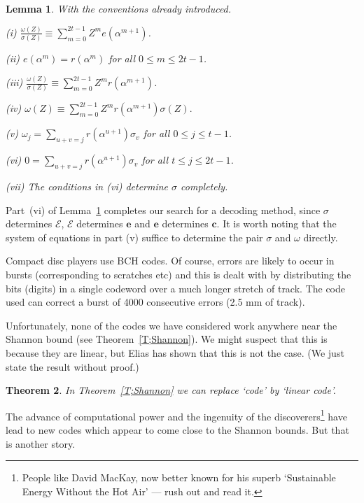 \documentclass[12pt,a4paper]{article}
\theoremstyle{plain}
\newtheorem{theorem}{Theorem}[section]
\newtheorem{lemma}[theorem]{Lemma}
\theoremstyle{definition}
\begin{document}
    \begin{lemma}
        \label{BCH decode}
        With the conventions already introduced.

        (i) ${\displaystyle
        \frac{\omega(Z)}{\sigma(Z)}\equiv
        \sum_{m=0}^{2t-1}Z^{m}e(\alpha^{m+1})}$.

        (ii) $e(\alpha^{m})=r(\alpha^{m})$ for all $0\leq m\leq 2t-1$.

        (iii) ${\displaystyle
        \frac{\omega(Z)}{\sigma(Z)}\equiv
        \sum_{m=0}^{2t-1}Z^{m}r(\alpha^{m+1})}$.

        (iv) $\omega(Z)\equiv\sum_{m=0}^{2t-1}Z^{m}r(\alpha^{m+1})
        \sigma(Z).$

        (v) ${\displaystyle
        \omega_{j}=\sum_{u+v=j}r(\alpha^{u+1})\sigma_{v}}$ for all
        $0\leq j\leq t-1$.

        (vi) ${\displaystyle
        0=\sum_{u+v=j}r(\alpha^{u+1})\sigma_{v}}$ for all $t\leq j\leq 2t-1$.

        (vii) The conditions in (vi) determine $\sigma$ completely.
    \end{lemma}
    \noindent
    Part~(vi) of Lemma~\ref{BCH decode} completes our search
    for a decoding method, since $\sigma$ determines ${\mathcal E}$,
    ${\mathcal E}$ determines ${\mathbf e}$ and ${\mathbf e}$
    determines ${\mathbf c}$. It is worth noting that
    the system of equations in part (v) suffice to determine
    the pair $\sigma$ and $\omega$ directly.

    Compact disc players use BCH codes. Of course, errors
    are likely to occur in bursts (corresponding to
    scratches etc) and this is dealt with by
    distributing the bits (digits) in a single codeword
    over a much longer stretch of track. The code used
    can correct a burst of 4000 consecutive errors
    (2.5 mm of track).


    Unfortunately, none of the codes we have considered
    work anywhere near the Shannon bound
    (see Theorem~\ref{T;Shannon}). We might suspect
    that this is because they are linear,
    but Elias has shown that this is not the case.
    (We just state the result without proof.)
    \begin{theorem}
        In Theorem~\ref{T;Shannon}  we can replace `code'
        by `linear code'.
    \end{theorem}
    \noindent

    The advance of computational power and the
    ingenuity of the discoverers\footnote{People
    like David MacKay, now better known for his
    superb `Sustainable Energy Without the Hot Air'
    --- rush out and read it.} have lead to
    new codes which appear to come close to
    the Shannon bounds. But that is another story.
\end{document}
